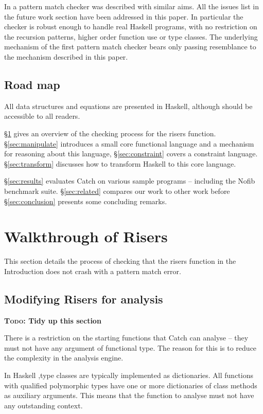 \documentclass[preprint]{sigplanconf}
\newcommand{\C}[1]{\textsf{#1}}
\newcommand{\todo}[1]{\textbf{\textsc{Todo:} #1}}
\begin{document}
In \citet{catch_tfp} a pattern match checker was described with similar aims. All the issues list in the future work section have been addressed in this paper. In particular the checker is robust enough to handle real Haskell programs, with no restriction on the recursion patterns, higher order function use or type classes. The underlying mechanism of the first pattern match checker bears only passing resemblance to the mechanism described in this paper.

\subsection{Road map}

All data structures and equations are presented in Haskell, although should be accessible to all readers.

\S\ref{sec:walkthrough} gives an overview of the checking process for the \C{risers} function. \S\ref{sec:manipulate} introduces a small core functional language and a mechanism for reasoning about this language, \S\ref{sec:constraint} covers a constraint language. \S\ref{sec:transform} discusses how to transform Haskell to this core language.

\S\ref{sec:results} evaluates Catch on various sample programs -- including the Nofib benchmark suite. \S\ref{sec:related} compares our work to other work before \S\ref{sec:conclusion} presents some concluding remarks.

\section{Walkthrough of Risers}
\label{sec:walkthrough}

This section details the process of checking that the \C{risers} function in the Introduction does not crash with a pattern match error.

\subsection{Modifying Risers for analysis}

\todo{Tidy up this section}

There is a restriction on the starting functions that Catch can analyse -- they must not have any argument of functional type. The reason for this is to reduce the complexity in the analysis engine.

In Haskell \citep{haskell},type classes are typically implemented \citep{type_classes} as dictionaries. All functions with qualified polymorphic types have one or more dictionaries of class methods as auxiliary arguments. This means that the function to analyse must not have any outstanding context.
\end{document}
